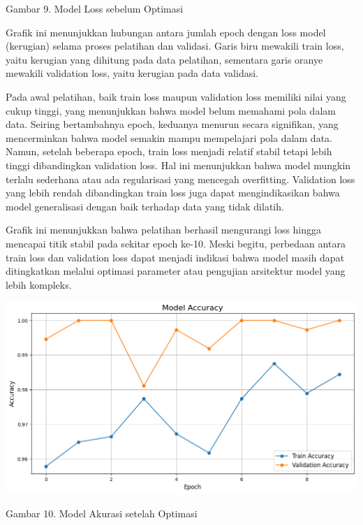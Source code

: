 \documentclass[12pt,a4paper]{article}
\begin{document}
\begin{center}
    Gambar 9. Model Loss sebelum Optimasi
\end{center}

Grafik ini menunjukkan hubungan antara jumlah epoch dengan loss model (kerugian) selama proses pelatihan dan validasi. Garis biru mewakili train loss, yaitu kerugian yang dihitung pada data pelatihan, sementara garis oranye mewakili validation loss, yaitu kerugian pada data validasi.

Pada awal pelatihan, baik train loss maupun validation loss memiliki nilai yang cukup tinggi, yang menunjukkan bahwa model belum memahami pola dalam data. Seiring bertambahnya epoch, keduanya menurun secara signifikan, yang mencerminkan bahwa model semakin mampu mempelajari pola dalam data. Namun, setelah beberapa epoch, train loss menjadi relatif stabil tetapi lebih tinggi dibandingkan validation loss. Hal ini menunjukkan bahwa model mungkin terlalu sederhana atau ada regularisasi yang mencegah overfitting. Validation loss yang lebih rendah dibandingkan train loss juga dapat mengindikasikan bahwa model generalisasi dengan baik terhadap data yang tidak dilatih.

Grafik ini menunjukkan bahwa pelatihan berhasil mengurangi loss hingga mencapai titik stabil pada sekitar epoch ke-10. Meski begitu, perbedaan antara train loss dan validation loss dapat menjadi indikasi bahwa model masih dapat ditingkatkan melalui optimasi parameter atau pengujian arsitektur model yang lebih kompleks.

\begin{center}
    \includegraphics[width=1.0\textwidth]{images/10.png}
\end{center}

\begin{center}
    Gambar 10. Model Akurasi setelah Optimasi
\end{center}
\end{document}
